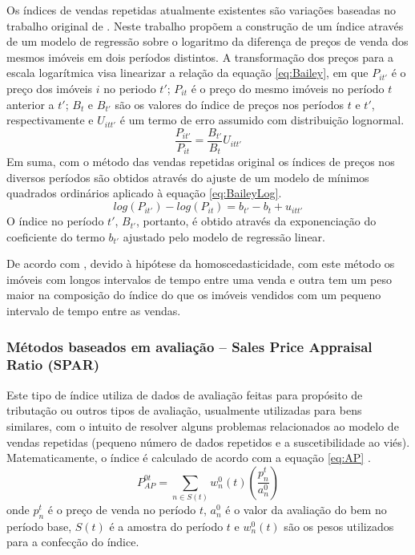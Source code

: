 \documentclass[
	12pt,				%
	oneside,			%
	a4paper,			%
	chapter=TITLE,		%
	section=TITLE,		%
	english,			%
	brazil				%
	]{abntex2}
\begin{document}
\begin{refsection}
Os índices de vendas repetidas atualmente existentes são variações baseadas no
trabalho original de \textcite{bailey1963}. Neste trabalho \textcite{bailey1963} propõem a
construção de um índice através de um modelo de regressão sobre o logaritmo da
diferença de preços de venda dos mesmos imóveis em dois períodos distintos. A
transformação dos preços para a escala logarítmica visa linearizar a relação da
equação \eqref{eq:Bailey}, em que \(P_{it'}\) é o preço dos imóveis \(i\) no periodo
\(t'\); \(P_{it}\) é o preço do mesmo imóveis no período \(t\) anterior a \(t'\); \(B_t\)
e \(B_{t'}\) são os valores do índice de preços nos períodos \(t\) e \(t'\),
respectivamente e \(U_{itt'}\) é um termo de erro assumido com distribuição
lognormal.
\begin{equation}
\label{eq:Bailey}
\frac{P_{it'}}{P_{it}} = \frac{B_{t'}}{B_t}U_{itt'}
\end{equation}
Em suma, com o método das vendas repetidas original os índices de preços nos
diversos períodos são obtidos através do ajuste de um modelo de mínimos
quadrados ordinários aplicado à equação \eqref{eq:BaileyLog}.
\begin{equation}
\label{eq:BaileyLog}
log(P_{it'}) - log(P_{it}) = b_{t'} - {b_t} + u_{itt'}
\end{equation}
O índice no período \(t'\), \(B_{t'}\), portanto, é obtido através da exponenciação
do coeficiente do termo \(b_{t'}\) ajustado pelo modelo de regressão linear.

De acordo com \textcite{repeatedSales}, devido à hipótese da homoscedasticidade, com este
método os imóveis com longos intervalos de tempo entre uma venda e outra tem
um peso maior na composição do índice do que os imóveis vendidos com um pequeno
intervalo de tempo entre as vendas.

\hypertarget{muxe9todos-baseados-em-avaliauxe7uxe3o-sales-price-appraisal-ratio-spar}{%
\subsubsection{Métodos baseados em avaliação -- Sales Price Appraisal Ratio (SPAR)}\label{muxe9todos-baseados-em-avaliauxe7uxe3o-sales-price-appraisal-ratio-spar}}

Este tipo de índice utiliza de dados de avaliação feitas para propósito de
tributação ou outros tipos de avaliação, usualmente utilizadas para bens
similares, com o intuito de resolver alguns problemas relacionados ao modelo de
vendas repetidas (pequeno número de dados repetidos e a suscetibilidade ao viés).
Matematicamente, o índice é calculado de acordo com a equação \eqref{eq:AP}
\autocite[75]{rppi}.
\begin{equation}
P_{AP}^{0t} = \sum_{n \in S(t)} w_n^0(t) \left ( \frac{p_n^t}{a_n^0} \right )
\label{eq:AP}
\end{equation}
onde \(p_n^t\) é o preço de venda no período \(t\), \(a_n^0\) é o valor da avaliação
do bem no período base, \(S(t)\) é a amostra do período \(t\) e \(w_n^0(t)\) são os
pesos utilizados para a confecção do índice.


\end{refsection}
\end{document}

